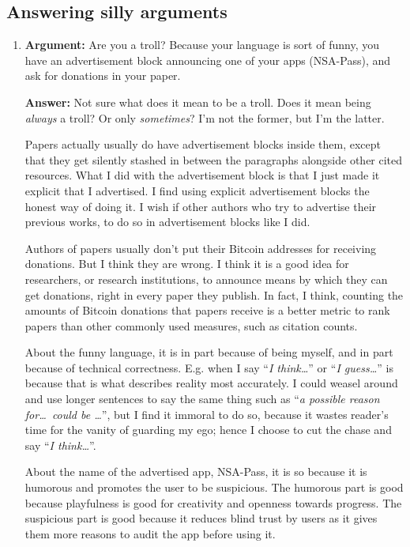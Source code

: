 \documentclass[twocolumn]{article}
\begin{document}
\subsection{Answering silly arguments}
\begin{enumerate}
    \item \textbf{Argument:} Are you a troll?  Because your language is
    sort of funny, you have an advertisement block announcing one of your
    apps (NSA-Pass), and ask for donations in your paper.

    \textbf{Answer:} Not sure what does it mean to be a troll.  Does it
    mean being \emph{always} a troll?  Or only \emph{sometimes}?  I'm not
    the former, but I'm the latter.

    Papers actually usually do have advertisement blocks inside them,
    except that they get silently stashed in between the paragraphs
    alongside other cited resources.  What I did with the advertisement
    block is that I just made it explicit that I advertised.  I find using
    explicit advertisement blocks the honest way of doing it.  I wish if
    other authors who try to advertise their previous works, to do so in
    advertisement blocks like I did.

    Authors of papers usually don't put their Bitcoin addresses for
    receiving donations.  But I think they are wrong.  I think it is a good
    idea for researchers, or research institutions, to announce means by
    which they can get donations, right in every paper they publish.  In
    fact, I think, counting the amounts of Bitcoin donations that papers
    receive is a better metric to rank papers than other commonly used
    measures, such as citation counts.

    About the funny language, it is in part because of being myself, and in
    part because of technical correctness.  E.g. when I say ``\emph{I
    think\ldots}'' or ``\emph{I guess\ldots}'' is because that is what
    describes reality most accurately.  I could weasel around and use
    longer sentences to say the same thing such as ``\emph{a possible
    reason for\ldots\ could be \ldots}'', but I find it immoral to do so,
    because it wastes reader's time for the vanity of guarding my ego;
    hence I choose to cut the chase and say ``\emph{I think\ldots}''.

    About the name of the advertised app, NSA-Pass, it is so because it is
    humorous and promotes the user to be suspicious.  The humorous part is
    good because playfulness is good for creativity and openness towards
    progress.  The suspicious part is good because it reduces blind trust
    by users as it gives them more reasons to audit the app before using
    it.


\end{enumerate}
\end{document}
